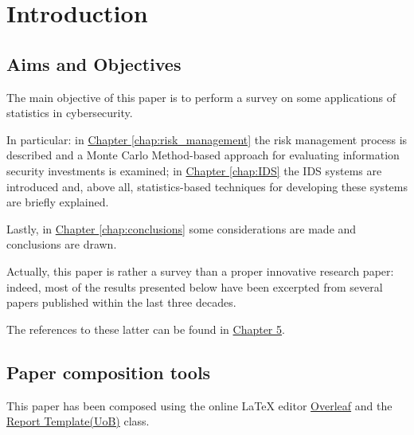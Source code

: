 \section{Introduction}
\label{chap:introduction}

\subsection{Aims and Objectives}
The main objective of this paper is to perform a survey on some applications of statistics in cybersecurity.

In particular: in \hyperref[chap:risk_management]{Chapter \ref*{chap:risk_management}} the risk management process is described and a Monte Carlo Method-based approach for evaluating information security investments is examined; in \hyperref[chap:IDS]{Chapter \ref*{chap:IDS}} the IDS systems are introduced and, above all, statistics-based techniques for developing these systems are briefly explained.

Lastly, in \hyperref[chap:conclusions]{Chapter \ref*{chap:conclusions}} some considerations are made and conclusions are drawn.

Actually, this paper is rather a survey than a proper innovative research paper: indeed, most of the results presented below have been excerpted from several papers published within the last three decades.

The references to these latter can be found in \hyperref[references]{Chapter 5}.

\subsection{Paper composition tools}
This paper has been composed using the online \textrm{\LaTeX} editor \href{https://www.overleaf.com/}{Overleaf} and the \href{https://www.overleaf.com/latex/templates/report-template-uob/mttrwcngwmrw}{Report Template(UoB)} class.

